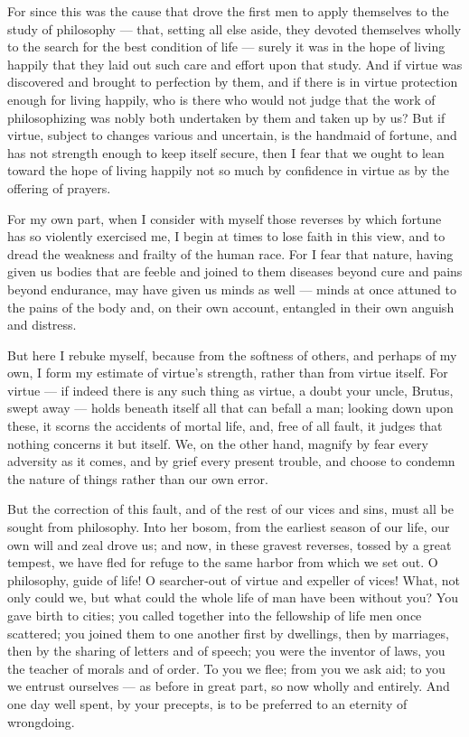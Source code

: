  For since this was the cause that drove the first men to apply themselves to the study of philosophy — that, setting all else aside, they devoted themselves wholly to the search for the best condition of life — surely it was in the hope of living happily that they laid out such care and effort upon that study. And if virtue was discovered and brought to perfection by them, and if there is in virtue protection enough for living happily, who is there who would not judge that the work of philosophizing was nobly both undertaken by them and taken up by us? But if virtue, subject to changes various and uncertain, is the handmaid of fortune, and has not strength enough to keep itself secure, then I fear that we ought to lean toward the hope of living happily not so much by confidence in virtue as by the offering of prayers.

 For my own part, when I consider with myself those reverses by which fortune has so violently exercised me, I begin at times to lose faith in this view, and to dread the weakness and frailty of the human race. For I fear that nature, having given us bodies that are feeble and joined to them diseases beyond cure and pains beyond endurance, may have given us minds as well — minds at once attuned to the pains of the body and, on their own account, entangled in their own anguish and distress.

 But here I rebuke myself, because from the softness of others, and perhaps of my own, I form my estimate of virtue's strength, rather than from virtue itself. For virtue — if indeed there is any such thing as virtue, a doubt your uncle, Brutus, swept away — holds beneath itself all that can befall a man; looking down upon these, it scorns the accidents of mortal life, and, free of all fault, it judges that nothing concerns it but itself. We, on the other hand, magnify by fear every adversity as it comes, and by grief every present trouble, and choose to condemn the nature of things rather than our own error.

 But the correction of this fault, and of the rest of our vices and sins, must all be sought from philosophy. Into her bosom, from the earliest season of our life, our own will and zeal drove us; and now, in these gravest reverses, tossed by a great tempest, we have fled for refuge to the same harbor from which we set out. O philosophy, guide of life! O searcher-out of virtue and expeller of vices! What, not only could we, but what could the whole life of man have been without you? You gave birth to cities; you called together into the fellowship of life men once scattered; you joined them to one another first by dwellings, then by marriages, then by the sharing of letters and of speech; you were the inventor of laws, you the teacher of morals and of order. To you we flee; from you we ask aid; to you we entrust ourselves — as before in great part, so now wholly and entirely. And one day well spent, by your precepts, is to be preferred to an eternity of wrongdoing.

